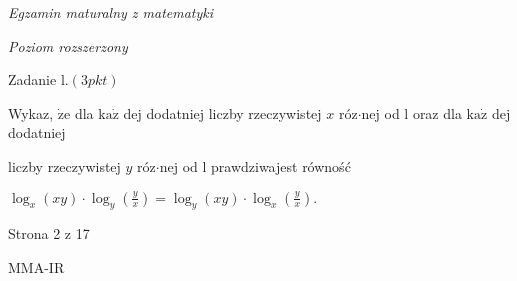 \documentclass[a4paper,12pt]{article}
\begin{document}
{\it Egzamin maturalny z matematyki}

{\it Poziom rozszerzony}

Zadanie l.$(3pkt)$

Wykaz, $\dot{\mathrm{z}}\mathrm{e}$ dla $\mathrm{k}\mathrm{a}\dot{\mathrm{z}}$ dej dodatniej liczby rzeczywistej $x$ róz$\cdot$nej od l oraz dla $\mathrm{k}\mathrm{a}\dot{\mathrm{z}}$ dej dodatniej

liczby rzeczywistej $y$ róz$\cdot$nej od l prawdziwajest równość

$\displaystyle \log_{x}(xy)\cdot\log_{y}(\frac{y}{x})=\log_{y}(xy)\cdot\log_{x}(\frac{y}{x}).$

Strona 2 z 17

MMA-IR
\end{document}

